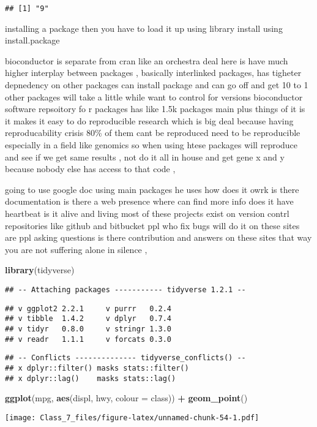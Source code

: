 \documentclass[]{article}
\newenvironment{Shaded}{\begin{snugshade}}{\end{snugshade}}
\newcommand{\KeywordTok}[1]{\textcolor[rgb]{0.13,0.29,0.53}{\textbf{#1}}}
\newcommand{\DataTypeTok}[1]{\textcolor[rgb]{0.13,0.29,0.53}{#1}}
\newcommand{\StringTok}[1]{\textcolor[rgb]{0.31,0.60,0.02}{#1}}
\newcommand{\OperatorTok}[1]{\textcolor[rgb]{0.81,0.36,0.00}{\textbf{#1}}}
\newcommand{\NormalTok}[1]{#1}
\begin{document}
\begin{verbatim}
## [1] "9"
\end{verbatim}

installing a package then you have to load it up using library install
using install.package

bioconductor is separate from cran like an orchestra deal here is have
much higher interplay between packages , basically interlinked packages,
has tigheter depnedency on other packages can install package and can go
off and get 10 to 1 other packages will take a little while want to
control for versions bioconductor software repsoitory fo r packages has
like 1.5k packages main plus things of it is it makes it easy to do
reproducible research which is big deal because having reproducability
crisis 80\% of them cant be reproduced need to be reproducible
especially in a field like genomics so when using htese packages will
reproduce and see if we get same results , not do it all in house and
get gene x and y because nobody else has access to that code ,

going to use google doc using main packages he uses how does it owrk is
there documentation is there a web presence where can find more info
does it have heartbeat is it alive and living most of these projects
exist on version contrl repositories like github and bitbucket ppl who
fix bugs will do it on these sites are ppl asking questions is there
contribution and answers on these sites that way you are not suffering
alone in silence ,

\begin{Shaded}
\begin{Highlighting}[]
\KeywordTok{library}\NormalTok{(tidyverse)}
\end{Highlighting}
\end{Shaded}

\begin{verbatim}
## -- Attaching packages ----------- tidyverse 1.2.1 --
\end{verbatim}

\begin{verbatim}
## v ggplot2 2.2.1     v purrr   0.2.4
## v tibble  1.4.2     v dplyr   0.7.4
## v tidyr   0.8.0     v stringr 1.3.0
## v readr   1.1.1     v forcats 0.3.0
\end{verbatim}

\begin{verbatim}
## -- Conflicts -------------- tidyverse_conflicts() --
## x dplyr::filter() masks stats::filter()
## x dplyr::lag()    masks stats::lag()
\end{verbatim}

\begin{Shaded}
\begin{Highlighting}[]
\KeywordTok{ggplot}\NormalTok{(mpg, }\KeywordTok{aes}\NormalTok{(displ, hwy, }\DataTypeTok{colour =}\NormalTok{ class)) }\OperatorTok{+}\StringTok{ }
\StringTok{  }\KeywordTok{geom_point}\NormalTok{()}
\end{Highlighting}
\end{Shaded}

\texttt{[image: Class\_7\_files/figure-latex/unnamed-chunk-54-1.pdf]}
\end{document}
